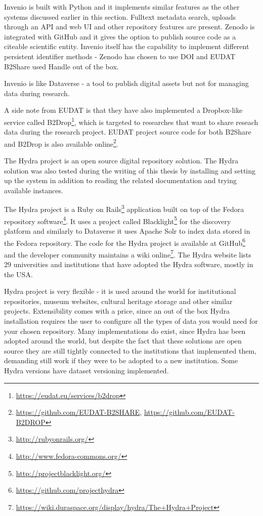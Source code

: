 Invenio is built with Python and it implements similar features as the other
systems discussed earlier in this section. Fulltext metadata search, uploads
through an API and web UI and other repository features are present. Zenodo is
integrated with GitHub and it gives the option to publish source code as a
citeable scientific entity. Invenio itself has the capability to implement
different persistent identifier methods - Zenodo has chosen to use DOI and
EUDAT B2Share used Handle out of the box.

Invenio is like Dataverse - a tool to publish digital assets but not
for managing data during research.

A side note from EUDAT is that they have also implemented a Dropbox-like
service called B2Drop\footnote{\url{https://eudat.eu/services/b2drop}},
which is targeted to researches that want to share
reseach data during the research project. EUDAT project source code for
both B2Share and B2Drop
is also available online\footnote{\url{https://github.com/EUDAT-B2SHARE},
\url{https://github.com/EUDAT-B2DROP}}.

The Hydra project is an open source digital repository solution. The Hydra
solution was also tested during the writing of this thesis by installing and
setting up the system in addition to reading the related documentation and
trying available instances.

The Hydra project is a Ruby on Rails\footnote{\url{http://rubyonrails.org/}}
application built on top of the Fedora repository software\footnote{\url{http://www.fedora-commons.org/}}.
It uses a project called Blacklight\footnote{\url{http://projectblacklight.org/}}
for the discovery platform and similarly to Dataverse it uses Apache Solr to
index data stored in the Fedora repository. The code for the Hydra project is
available at GitHub\footnote{\url{https://github.com/projecthydra}} and the
developer community maintains a wiki online\footnote{\url{https://wiki.duraspace.org/display/hydra/The+Hydra+Project}}. The Hydra website lists 29 universities and institutions that have
adopted the Hydra software, mostly in the USA.

Hydra project is very flexible - it is used around the world for institutional
repositories, museum websites, cultural heritage storage and other similar
projects. Extensibility comes with a price, since an out of the box Hydra
installation requires the user to configure all the types of data you would
need for your chosen repository. Many implementations do exist, since Hydra
has been adopted around the world, but despite the fact that these solutions
are open source they are still tightly connected to the institutions that
implemented them, demanding still work if they were to be adopted to a new
institution. Some Hydra versions have dataset versioning implemented.


